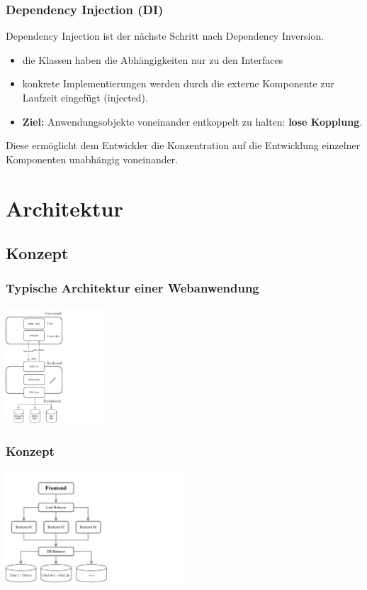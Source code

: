\documentclass{beamer} %
\begin{document}
\begin{frame}
\frametitle{Dependency Injection (DI)}
Dependency Injection ist der nächste Schritt nach Dependency Inversion.

\begin{itemize}
\item die Klassen haben die Abhängigkeiten nur zu den Interfaces
\item konkrete Implementierungen werden durch die externe Komponente zur Laufzeit eingefügt (injected).

\item \textbf{Ziel:} Anwendungsobjekte voneinander entkoppelt zu halten: \textbf{lose Kopplung}.
\end{itemize}
Diese ermöglicht dem Entwickler die Konzentration auf die Entwicklung einzelner Komponenten unabhängig voneinander.
\end{frame}



\section[Architektur]{Architektur}
\subsection[Architektur]{Konzept}

\begin{frame}
\frametitle{Typische Architektur einer Webanwendung}
\begin{center}
\includegraphics[trim = 0mm 0mm 0mm 5mm, clip, width=0.28\textwidth]{img/architectureMyAppWithoutFrameworks}
\end{center}
\end{frame}

\begin{frame}
\frametitle{Konzept}
\begin{center}
\includegraphics[trim = 0mm 0mm 0mm 0mm, clip, width=0.50\textwidth]{img/ueberblickArchitektur}
\end{center}
\end{frame}
\end{document}
